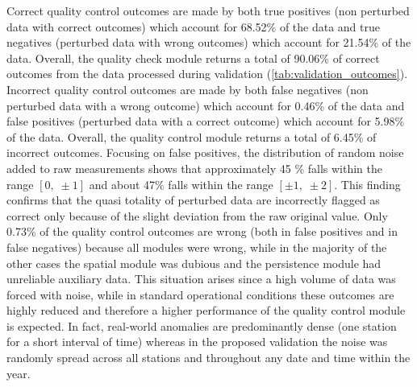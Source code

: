 \documentclass[authoryear,preprint,review,12pt]{elsarticle}
\begin{document}
Correct quality control outcomes are made by both true positives (non perturbed data with correct outcomes) which account for 68.52\% of the data and true negatives (perturbed data with wrong outcomes) which account for 21.54\% of the data. 
Overall, the quality check module returns a total of 90.06\% of correct outcomes from the data processed during validation (\cref{tab:validation_outcomes}).
Incorrect quality control outcomes are made by both false negatives (non perturbed data with a wrong outcome) which account for 0.46\% of the data and false positives (perturbed data with a correct outcome) which account for 5.98\% of the data. 
Overall, the quality control module returns a total of 6.45\% of incorrect outcomes. 
Focusing on false positives, the distribution of random noise added to raw measurements shows that approximately 45 \% falls within the range $[0,\; \pm1]$ and about 47\% falls within the range $[\pm1,\; \pm2]$. 
This finding confirms that the quasi totality of perturbed data are incorrectly flagged as correct only because of the slight deviation from the raw original value.
Only 0.73\% of the quality control outcomes are wrong (both in false positives and in false negatives) because all modules were wrong, while in the majority of the other cases the spatial module was dubious and the persistence module had unreliable auxiliary data.
This situation arises since a high volume of data was forced with noise, while in standard operational conditions these outcomes are highly reduced and therefore a higher performance of the quality control module is expected.
In fact, real-world anomalies are predominantly dense (one station for a short interval of time) whereas in the proposed validation the noise was randomly spread across all stations and throughout any date and time within the year. 
\end{document}
